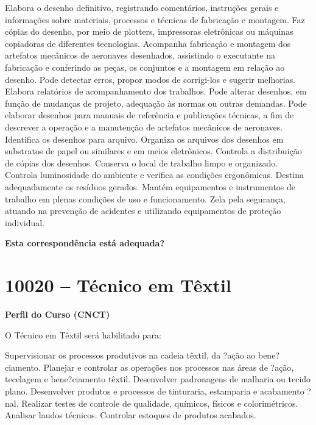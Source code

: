 \documentclass[
]{article}
\begin{document}
Elabora o desenho definitivo, registrando comentários, instruções gerais
e informações sobre materiais, processos e técnicas de fabricação e
montagem. Faz cópias do desenho, por meio de plotters, impressoras
eletrônicas ou máquinas copiadoras de diferentes tecnologias. Acompanha
fabricação e montagem dos artefatos mecânicos de aeronaves desenhados,
assistindo o executante na fabricação e conferindo as peças, os
conjuntos e a montagem em relação ao desenho. Pode detectar erros,
propor modos de corrigi-los e sugerir melhorias. Elabora relatórios de
acompanhamento dos trabalhos. Pode alterar desenhos, em função de
mudanças de projeto, adequação às normas ou outras demandas. Pode
elaborar desenhos para manuais de referência e publicações técnicas, a
fim de descrever a operação e a manutenção de artefatos mecânicos de
aeronaves. Identifica os desenhos para arquivo. Organiza os arquivos dos
desenhos em substratos de papel ou similares e em meios eletrônicos.
Controla a distribuição de cópias dos desenhos. Conserva o local de
trabalho limpo e organizado. Controla luminosidade do ambiente e
verifica as condições ergonômicas. Destina adequadamente os resíduos
gerados. Mantém equipamentos e instrumentos de trabalho em plenas
condições de uso e funcionamento. Zela pela segurança, atuando na
prevenção de acidentes e utilizando equipamentos de proteção individual.

\begin{Form}
\textbf{Esta correspondência está adequada?} \\ 
\end{Form}

\newpage
\section{ 10020 -- Técnico em Têxtil }

\textbf{Perfil do Curso (CNCT)}

O Técnico em Têxtil será habilitado para:

Supervisionar os processos produtivos na cadeia têxtil, da ?ação ao
bene?ciamento. Planejar e controlar as operações nos processos nas áreas
de ?ação, tecelagem e bene?ciamento têxtil. Desenvolver padronagens de
malharia ou tecido plano. Desenvolver produtos e processos de
tinturaria, estamparia e acabamento ?nal. Realizar testes de controle de
qualidade, químicos, físicos e colorimétricos. Analisar laudos técnicos.
Controlar estoques de produtos acabados.
\end{document}
